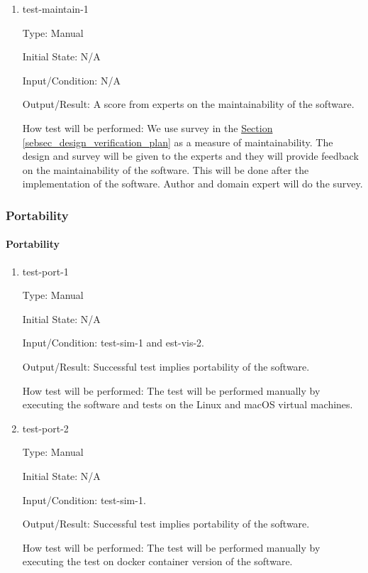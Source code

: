 \documentclass[12pt, titlepage]{article}
\begin{document}
\begin{enumerate}

  \item{test-maintain-1\\}

        Type: Manual

        Initial State: N/A

        Input/Condition: N/A

        Output/Result: A score from experts on the maintainability of the software.

        How test will be performed: We use survey in the
        \hyperref[sebsec_design_verification_plan]{Section \ref*{sebsec_design_verification_plan}} as
        a measure of maintainability. The design and survey will be given to the experts and
        they will provide feedback on the maintainability of the software.
        This will be done after the implementation of the software.
        Author and domain expert will do the survey.

\end{enumerate}

\subsubsection{Portability}

\paragraph{Portability}

\begin{enumerate}

  \item{test-port-1\\}

        Type: Manual

        Initial State: N/A

        Input/Condition: test-sim-1 and est-vis-2.

        Output/Result: Successful test implies portability of the software.

        How test will be performed: The test will be performed manually
        by executing the software and tests on the Linux and macOS virtual machines.

  \item{test-port-2\\}

        Type: Manual

        Initial State: N/A

        Input/Condition: test-sim-1.

        Output/Result: Successful test implies portability of the software.

        How test will be performed: The test will be performed manually
        by executing the test on docker container version of the software.

\end{enumerate}
\end{document}
